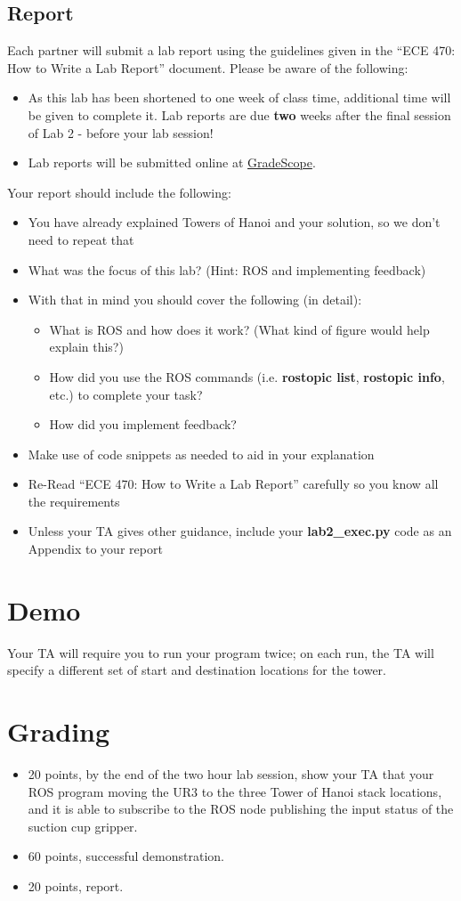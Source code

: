 \subsection{Report}
Each partner will submit a lab report using the guidelines given in the “ECE 470: How to Write a Lab Report” document.  Please be aware of the following:
\begin{itemize}
	\item As this lab has been shortened to one week of class time, additional time will be given to complete it. Lab reports are due \textbf{two} weeks after the final session of Lab 2 - before your lab session!
	\item Lab reports will be submitted online at \href{www.gradescope.com}{GradeScope}.
\end{itemize}
Your report should include the following:
\begin{itemize}	
	\item You have already explained Towers of Hanoi and your solution, so we don’t need to repeat that
	\item What was the focus of this lab? (Hint: ROS and implementing feedback)
	\item With that in mind you should cover the following (in detail):
	\begin{itemize}
		\item What is ROS and how does it work? (What kind of figure would help explain this?)
		\item How did you use the ROS commands (i.e. \textbf{rostopic list}, \textbf{rostopic info}, etc.) to complete your task?
		\item How did you implement feedback?
	\end{itemize}
	\item Make use of code snippets as needed to aid in your explanation
	\item Re-Read “ECE 470: How to Write a Lab Report” carefully so you know all the requirements
	\item Unless your TA gives other guidance, include your \textbf{lab2\_exec.py} code as an Appendix to your report	
\end{itemize}

\section{Demo}
Your TA will require you to run your program twice; on each run, the TA will specify a different set of start and destination locations for the tower.

\section{Grading}
\begin{itemize}
\item 20 points, by the end of the two hour lab session, show your TA that your ROS program moving the UR3 to the three Tower of Hanoi stack locations, and it is able to subscribe to the ROS node publishing the input status of the 
suction cup gripper.
\item 60 points, successful demonstration.
\item 20 points, report.
\end{itemize}